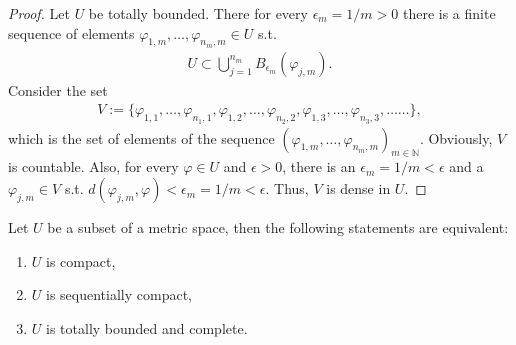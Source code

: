\begin{proof}
	Let $U$ be totally bounded. There for every $\epsilon_{m} = 1/m > 0$ there is a finite sequence of elements $\varphi_{1, m}, \dots, \varphi_{n_m, m}\in U$ s.t.
	\begin{align*}
		U \subset \bigcup_{j = 1}^{n_m}B_{\epsilon_m}(\varphi_{j, m}).
	\end{align*}
	Consider the set
	\begin{align*}
		V := \{\varphi_{1, 1}, \dots, \varphi_{n_1, 1}, \varphi_{1, 2}, \dots, \varphi_{n_2, 2}, \varphi_{1, 3}, \dots, \varphi_{n_3, 3}, \dots \dots\},
	\end{align*}
	which is the set of elements of the sequence $\left(\varphi_{1, m}, \dots, \varphi_{n_m, m}\right)_{m\in\mathbb N}$. Obviously, $V$ is countable. Also, for every $\varphi\in U$ and $\epsilon > 0$, there is an $\epsilon_m = 1/m < \epsilon$ and a $\varphi_{j, m}\in V$ s.t. $d(\varphi_{j, m}, \varphi) < \epsilon_m = 1/m < \epsilon$. Thus, $V$ is dense in $U$.
\end{proof}

\begin{theorem}\label{thrm:compact_seq_totally_bound_compl}
	Let $U$ be a subset of a metric space, then the following statements are equivalent:
	\begin{enumerate}[label=(\alph*)]
		\item $U$ is compact, 
		\item $U$ is sequentially compact,
		\item $U$ is totally bounded and complete.
	\end{enumerate}
\end{theorem}

